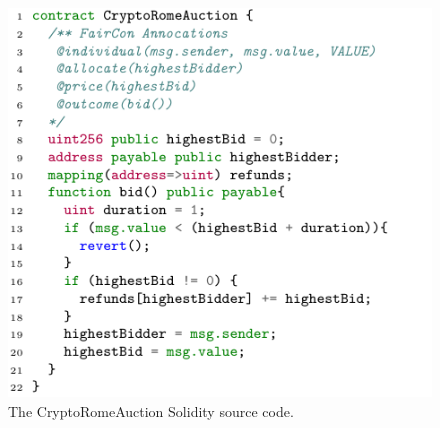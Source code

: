 \begin{figure}[t]
  \centering
  \includegraphics[width=.9\columnwidth]{Figures/Chapter3/auction.pdf}
  \caption{The CryptoRomeAuction Solidity source code.}\label{CryptoRomeAuction}
\end{figure}


